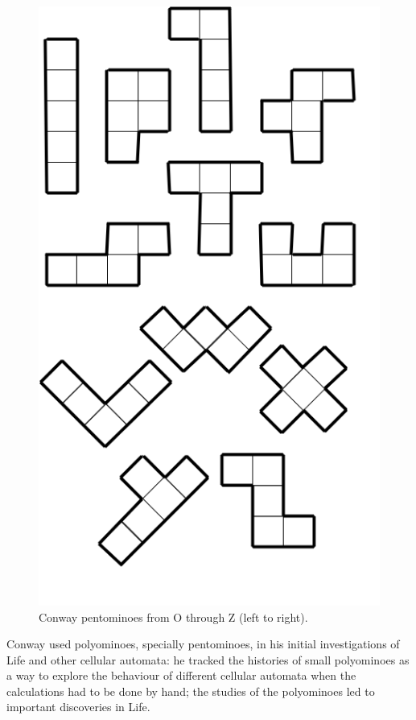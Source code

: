 \begin{figure}[H]
	\centering
	\includegraphics[scale=0.25]{diagrams/conway_pentominoes.PNG}
	\caption{Conway pentominoes from O through Z (left to right).}
  \label{fig:conway_pentominoes}
\end{figure}

Conway used polyominoes, specially pentominoes, in his initial investigations of
Life and other cellular automata: he tracked the histories of small polyominoes
as a way to explore the behaviour of different cellular automata when the
calculations had to be done by hand; the studies of the polyominoes led to
important discoveries in Life.

